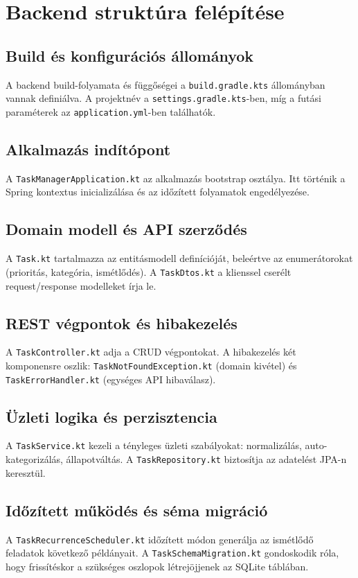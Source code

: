 \documentclass[12pt,a4paper]{article}
\begin{document}
\section{Backend struktúra felépítése}
\subsection{Build és konfigurációs állományok}
A backend build-folyamata és függőségei a \texttt{build.gradle.kts} állományban vannak definiálva. A projektnév a \texttt{settings.gradle.kts}-ben, míg a futási paraméterek az \texttt{application.yml}-ben találhatók.

\subsection{Alkalmazás indítópont}
A \texttt{TaskManagerApplication.kt} az alkalmazás bootstrap osztálya. Itt történik a Spring kontextus inicializálása és az időzített folyamatok engedélyezése.


\subsection{Domain modell és API szerződés}
A \texttt{Task.kt} tartalmazza az entitásmodell definícióját, beleértve az enumerátorokat (prioritás, kategória, ismétlődés). A \texttt{TaskDtos.kt} a klienssel cserélt request/response modelleket írja le.

\subsection{REST végpontok és hibakezelés}
A \texttt{TaskController.kt} adja a CRUD végpontokat. A hibakezelés két komponensre oszlik: \texttt{TaskNotFoundException.kt} (domain kivétel) és \texttt{TaskErrorHandler.kt} (egységes API hibaválasz).

\subsection{Üzleti logika és perzisztencia}
A \texttt{TaskService.kt} kezeli a tényleges üzleti szabályokat: normalizálás, auto-kategorizálás, állapotváltás. A \texttt{TaskRepository.kt} biztosítja az adatelést JPA-n keresztül.

\subsection{Időzített működés és séma migráció}
A \texttt{TaskRecurrenceScheduler.kt} időzített módon generálja az ismétlődő feladatok következő példányait. A \texttt{TaskSchemaMigration.kt} gondoskodik róla, hogy frissítéskor a szükséges oszlopok létrejöjjenek az SQLite táblában.
\end{document}
